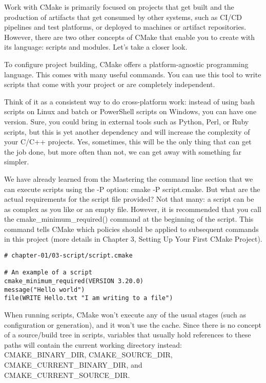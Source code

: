 
Work with CMake is primarily focused on projects that get built and the production of artifacts that get consumed by other systems, such as CI/CD pipelines and test platforms, or deployed to machines or artifact repositories. However, there are two other concepts of CMake that enable you to create with its language: scripts and modules. Let's take a closer look.


To configure project building, CMake offers a platform-agnostic programming language. This comes with many useful commands. You can use this tool to write scripts that come with your project or are completely independent.
 
Think of it as a consistent way to do cross-platform work: instead of using bash scripts on Linux and batch or PowerShell scripts on Windows, you can have one version. Sure, you could bring in external tools such as Python, Perl, or Ruby scripts, but this is yet another dependency and will increase the complexity of your C/C++ projects. Yes, sometimes, this will be the only thing that can get the job done, but more often than not, we can get away with something far simpler.

We have already learned from the Mastering the command line section that we can execute scripts using the -P option: cmake -P script.cmake. But what are the actual requirements for the script file provided? Not that many: a script can be as complex as you like or an empty file. However, it is recommended that you call the cmake\_minimum\_required() command at the beginning of the script. This command tells CMake which policies should be applied to subsequent commands in this project (more details in Chapter 3, Setting Up Your First CMake Project).

\begin{lstlisting}[style=styleCMake]	
# chapter-01/03-script/script.cmake
	
# An example of a script
cmake_minimum_required(VERSION 3.20.0)
message("Hello world")
file(WRITE Hello.txt "I am writing to a file")
\end{lstlisting}

When running scripts, CMake won't execute any of the usual stages (such as configuration or generation), and it won't use the cache. Since there is no concept of a source/build tree in scripts, variables that usually hold references to these paths will contain the current working directory instead: CMAKE\_BINARY\_DIR, CMAKE\_SOURCE\_DIR, CMAKE\_CURRENT\_BINARY\_DIR, and CMAKE\_CURRENT\_SOURCE\_DIR.

